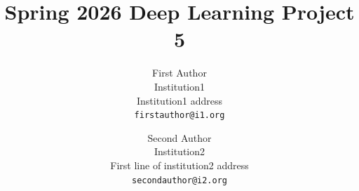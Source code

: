 \documentclass[10pt,twocolumn,letterpaper]{article}
\title{Spring 2026 Deep Learning Project 5}
\author{First Author\\
Institution1\\
Institution1 address\\
{\tt\small firstauthor@i1.org}
\and
Second Author\\
Institution2\\
First line of institution2 address\\
{\tt\small secondauthor@i2.org}
}
\begin{document}
\maketitle
    




{
    \small
    
    
}

% 
\end{document}
